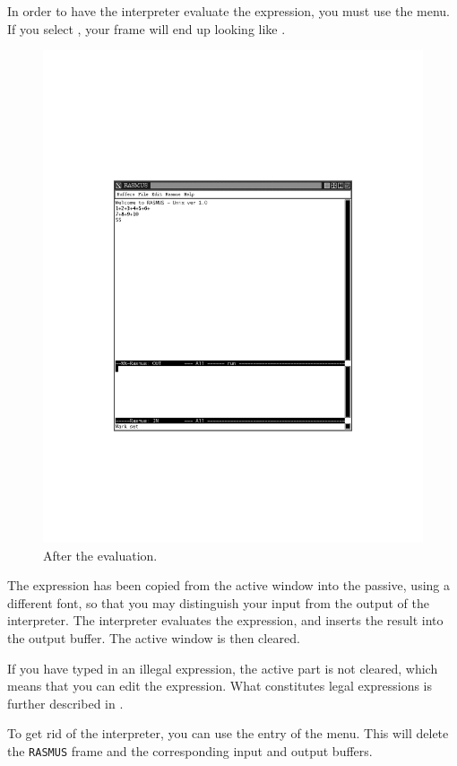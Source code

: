 In order to have the interpreter evaluate the expression, you must use
the  menu. If you select , your frame will
end up looking like .
\begin{figure}[p]
\centerline{\includegraphics[]{rasfig-firsteval.pdf}}
\caption{After the evaluation.}
\label{oneexpevaluated}
\end{figure}
The expression has been copied from the active window into the passive,
using a different font, so that you may distinguish your input from
the output of the interpreter. The interpreter evaluates the
expression, and inserts the result into the output buffer. The active
window is then cleared.

If you have typed in an illegal expression, the active part is not
cleared, which means that you can edit the expression. What constitutes legal
expressions is further described in .

To get rid of the interpreter, you can use the  entry of the
 menu. This will delete the {\tt RASMUS} frame and the
corresponding input and output buffers.
